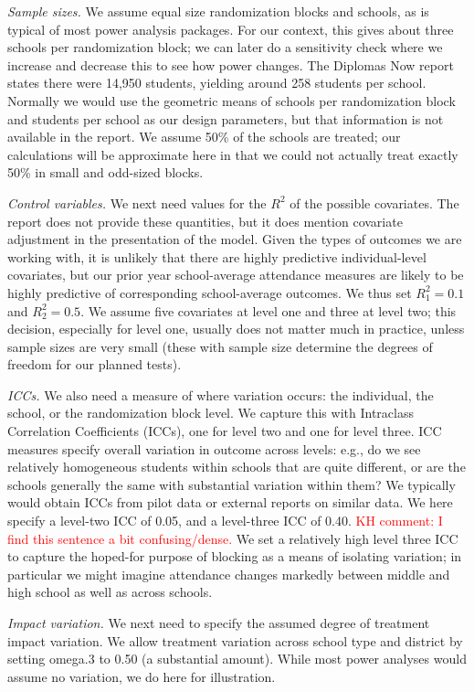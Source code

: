 \documentclass[
]{article}
\begin{document}
\emph{Sample sizes.} We assume equal size randomization blocks and
schools, as is typical of most power analysis packages. For our context,
this gives about three schools per randomization block; we can later do
a sensitivity check where we increase and decrease this to see how power
changes. The Diplomas Now report states there were 14,950 students,
yielding around 258 students per school. Normally we would use the
geometric means of schools per randomization block and students per
school as our design parameters, but that information is not available
in the report. We assume 50\% of the schools are treated; our
calculations will be approximate here in that we could not actually
treat exactly 50\% in small and odd-sized blocks.

\emph{Control variables.} We next need values for the \(R^2\) of the
possible covariates. The report does not provide these quantities, but
it does mention covariate adjustment in the presentation of the model.
Given the types of outcomes we are working with, it is unlikely that
there are highly predictive individual-level covariates, but our prior
year school-average attendance measures are likely to be highly
predictive of corresponding school-average outcomes. We thus set
\(R^2_1 = 0.1\) and \(R^2_2 = 0.5\). We assume five covariates at level
one and three at level two; this decision, especially for level one,
usually does not matter much in practice, unless sample sizes are very
small (these with sample size determine the degrees of freedom for our
planned tests).

\emph{ICCs.} We also need a measure of where variation occurs: the
individual, the school, or the randomization block level. We capture
this with Intraclass Correlation Coefficients (ICCs), one for level two
and one for level three. ICC measures specify overall variation in
outcome across levels: e.g., do we see relatively homogeneous students
within schools that are quite different, or are the schools generally
the same with substantial variation within them? We typically would
obtain ICCs from pilot data or external reports on similar data. We here
specify a level-two ICC of 0.05, and a level-three ICC of 0.40.
\textcolor{red}{KH comment: I find this sentence a bit confusing/dense.}
We set a relatively high level three ICC to capture the hoped-for
purpose of blocking as a means of isolating variation; in particular we
might imagine attendance changes markedly between middle and high school
as well as across schools.

\emph{Impact variation.} We next need to specify the assumed degree of
treatment impact variation. We allow treatment variation across school
type and district by setting omega.3 to 0.50 (a substantial amount).
While most power analyses would assume no variation, we do here for
illustration.
\end{document}
